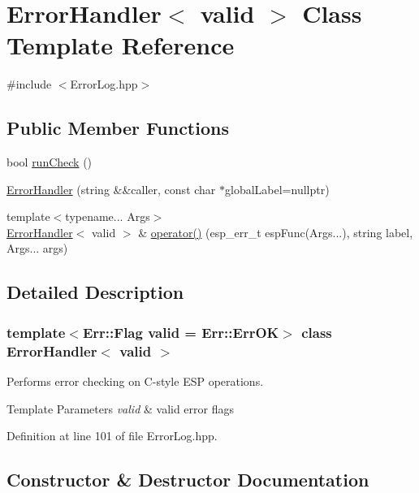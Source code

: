 \hypertarget{classErrorHandler}{}\section{Error\+Handler$<$ valid $>$ Class Template Reference}
\label{classErrorHandler}


{\ttfamily \#include $<$Error\+Log.\+hpp$>$}

\subsection*{Public Member Functions}
\begin{DoxyCompactItemize}
\item 
bool \mbox{\hyperlink{classErrorHandler_a2fb21215e61a07ab1ef590ec98629039}{run\+Check}} ()
\item 
\mbox{\hyperlink{classErrorHandler_a1496a1ea2a04ad3333ceb74b7e3948c8}{Error\+Handler}} (string \&\&caller, const char $\ast$global\+Label=nullptr)
\item 
{\footnotesize template$<$typename... Args$>$ }\\\mbox{\hyperlink{classErrorHandler}{Error\+Handler}}$<$ valid $>$ \& \mbox{\hyperlink{classErrorHandler_a0be34c542953af71ff23efa474ddd2bb}{operator()}} (esp\+\_\+err\+\_\+t esp\+Func(Args...), string label, Args... args)
\end{DoxyCompactItemize}


\subsection{Detailed Description}
\subsubsection*{template$<$Err\+::\+Flag valid = Err\+::\+Err\+OK$>$\newline
class Error\+Handler$<$ valid $>$}

Performs error checking on C-\/style E\+SP operations.


\begin{DoxyTemplParams}{Template Parameters}
{\em valid} & valid error flags \\
\hline
\end{DoxyTemplParams}


Definition at line 101 of file Error\+Log.\+hpp.



\subsection{Constructor \& Destructor Documentation}
\mbox{\label{classErrorHandler_a1496a1ea2a04ad3333ceb74b7e3948c8}} 

